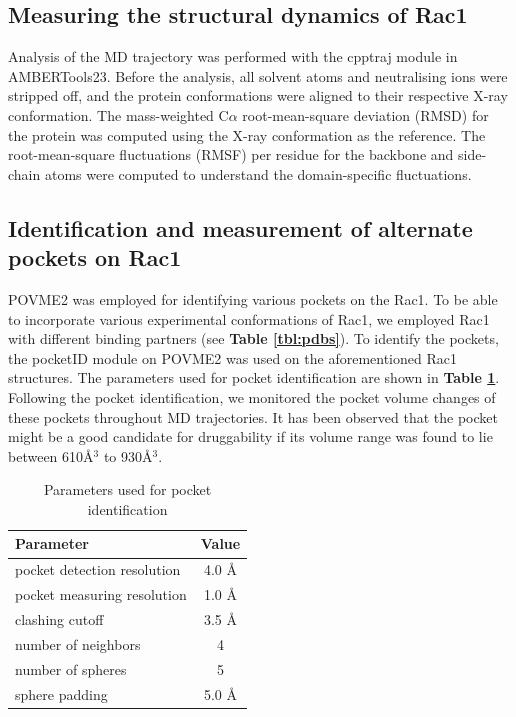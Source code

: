 \documentclass[12pt, a4paper]{achemso}
\begin{document}
\subsection{Measuring the structural dynamics of Rac1} 
    Analysis of the MD trajectory was performed with the cpptraj\cite{cpptraj} module in AMBERTools23.  Before the analysis, all solvent atoms and neutralising ions were stripped off, and the protein conformations were aligned to their respective X-ray conformation.  The mass-weighted C$\alpha$ root-mean-square deviation (RMSD) for the protein was computed using the X-ray conformation as the reference. The root-mean-square fluctuations (RMSF) per residue for the backbone and side-chain atoms were computed to understand the domain-specific fluctuations. 
    

\subsection{Identification and measurement of alternate pockets on Rac1} 
    POVME2 \cite{durrant2011povme, durrant2014povme} was employed for identifying various pockets on the Rac1. To be able to incorporate various experimental conformations of Rac1, we employed Rac1 with different binding partners (see \textbf{Table \ref{tbl:pdbs}}).  To identify the pockets, the pocketID module on POVME2 was used on the aforementioned Rac1 structures. The parameters used for pocket identification are shown in \textbf{Table \ref{tbl:pocketParameters}}. Following the pocket identification, we monitored the pocket volume changes of these pockets throughout MD trajectories. It has been observed that the pocket might be a good candidate for druggability if its volume range was found to lie between 610\r{A}$^3$ to 930\r{A}$^3$\cite{perot2010druggable, nayal2006nature, an2005pocketome}. 
  \begin{table}
  \caption{Parameters used for pocket identification}
  \label{tbl:pocketParameters}
  \begin{tabular}{lc}
    \hline
   \textbf{Parameter}  & \textbf{Value} \\
    \hline
    pocket detection resolution	 & 4.0 \r{A}  \\
    pocket measuring resolution & 1.0 \r{A} \\
    clashing cutoff & 3.5 \r{A}  \\
    number of neighbors & 4  \\ 
    number of spheres & 5  \\
    sphere padding & 5.0 \r{A}  \\ 
    \hline
  \end{tabular}
\end{table}
\end{document}
